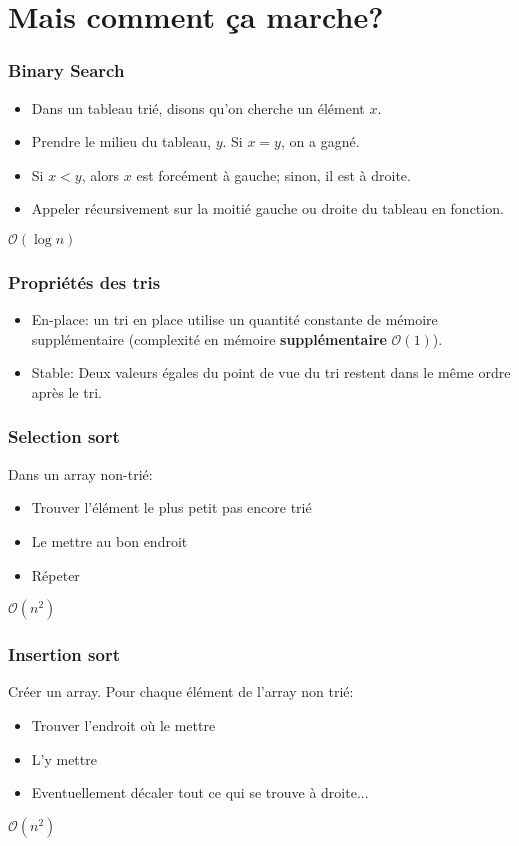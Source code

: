 \documentclass[8pt,aspectratio=169]{beamer}
\begin{document}
\section{Mais comment ça marche?}

\begin{frame}
\frametitle{Binary Search}
\begin{itemize}
	\item Dans un tableau trié, disons qu'on cherche un élément $x$.
	\item Prendre le milieu du tableau, $y$. Si $x=y$, on a gagné.
	\item Si $x < y$, alors $x$ est forcément à gauche; sinon, il est à droite.
	\item Appeler récursivement sur la moitié gauche ou droite du tableau en fonction.
\end{itemize}
$\mathcal{O}(\log n)$
\end{frame}

\begin{frame}
\frametitle{Propriétés des tris}
\begin{itemize}
	\item En-place: un tri en place utilise un quantité constante de mémoire supplémentaire (complexité en mémoire \textbf{supplémentaire} $\mathcal{O}(1)$).
	\item Stable: Deux valeurs égales du point de vue du tri restent dans le même ordre après le tri.
\end{itemize}
\end{frame}

\begin{frame}
\frametitle{Selection sort}
Dans un array non-trié:
\begin{itemize}
	\item Trouver l'élément le plus petit pas encore trié
	\item Le mettre au bon endroit
	\item Répeter
\end{itemize}
$\mathcal{O}(n^2)$
\end{frame}

\begin{frame}
\frametitle{Insertion sort}
Créer un array. Pour chaque élément de l'array non trié:
\begin{itemize}
	\item Trouver l'endroit où le mettre
	\item L'y mettre
	\item Eventuellement décaler tout ce qui se trouve à droite...
\end{itemize}
$\mathcal{O}(n^2)$
\end{frame}
\end{document}
